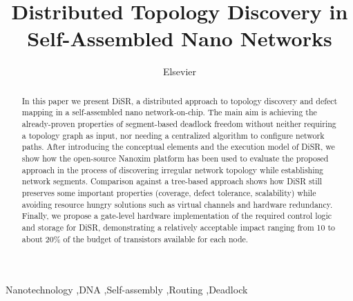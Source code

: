 \documentclass[preprint]{elsarticle}
\newcommand{\disr}{{\sf DiSR}}
\begin{document}
\begin{frontmatter}

\title{Distributed Topology Discovery in Self-Assembled Nano Networks}

\author{Elsevier}
\address{Radarweg 29, Amsterdam}





\begin{abstract}
In this paper we present \disr{}, a distributed approach to topology
discovery and defect mapping in a self-assembled nano
network-on-chip. The main aim is achieving the already-proven
properties of segment-based deadlock freedom without neither requiring
a topology graph as input, nor needing a centralized algorithm to
configure network paths.  After introducing the conceptual elements
and the execution model of \disr{}, we show how the open-source Nanoxim
platform has been used to evaluate the proposed approach in the
process of discovering irregular network topology while establishing
network segments. Comparison against a tree-based approach shows how
\disr{} still preserves some important properties (coverage, defect
tolerance, scalability) while avoiding resource hungry solutions such
as virtual channels and hardware redundancy. Finally, we propose a
gate-level hardware implementation of the required control logic and
storage for \disr{}, demonstrating a relatively acceptable impact
ranging from 10 to about 20\% of the budget of transistors available
for each node.
\end{abstract}

\begin{keyword}
Nanotechnology \sep DNA \sep Self-assembly \sep Routing \sep Deadlock
\end{keyword}
\end{frontmatter}
\end{document}
